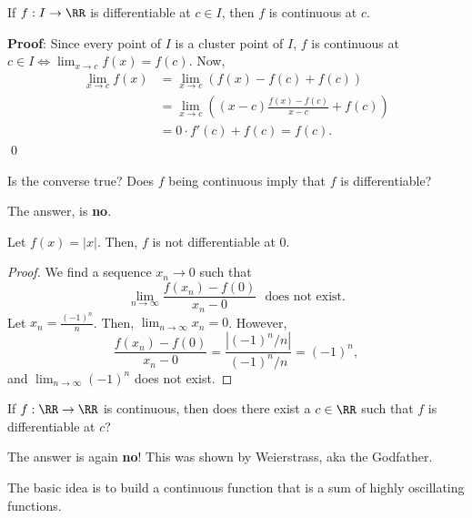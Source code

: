 
\begin{theorem}
If $f:I \to \RR$ is differentiable at $c\in I$, then $f$ is continuous at $c$.
\end{theorem}
\textbf{Proof}: Since every point of $I$ is a cluster point of $I$, $f$ is continuous at $c\in I \iff \lim_{x\to c} f(x) =f(c)$. Now, 
\begin{align*}
    \lim_{x\to c} f(x) &= \lim_{x\to c} (f(x) -f(c)+f(c)) \\
    &= \lim_{x\to c} \left((x-c) \frac{f(x)-f(c)}{x-c} + f(c)\right) \\
    &= 0\cdot f'(c) + f(c) = f(c).
\end{align*}
\qed 

\begin{question}
Is the converse true? Does $f$ being continuous imply that $f$ is differentiable?
\end{question}
The answer, is \textbf{no}.
\begin{example}
Let $f(x) = |x|$. Then, $f$ is not differentiable at 0.
\end{example}
\begin{proof}
We find a sequence $x_n\to 0$ such that 
\[
\lim_{n\to \infty} \frac{f(x_n) - f(0)}{x_n-0} \text{~~does not exist.} 
\]
Let $x_n = \frac{(-1)^n}{n}$. Then, $\lim_{n\to \infty} x_n = 0$. However,
\[
\frac{f(x_n) - f(0)}{x_n-0} = \frac{|(-1)^n/n|}{(-1)^n/n} = (-1)^n,
\]
and $\lim_{n\to \infty}(-1)^n$ does not exist.
\end{proof}

\begin{question}
If $f:\RR\to \RR$ is continuous, then does there exist a $c\in \RR$ such that $f$ is differentiable at $c$? 
\end{question}
The answer is again \textbf{no}! This was shown by Weierstrass, aka the Godfather.

The basic idea is to build a continuous function that is a sum of highly oscillating functions.

